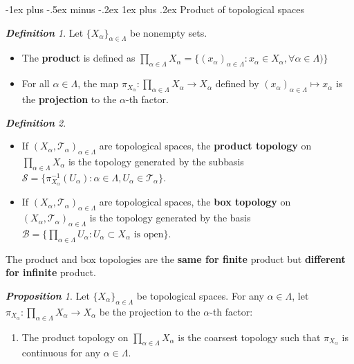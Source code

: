\documentclass[frenchspacing,9pt,landscape,a4paper]{article}
\makeatletter
\renewcommand{\subsubsection}{\@startsection{subsubsection}{3}{0mm}%
                                {-1ex plus -.5ex minus -.2ex}%
                                {1ex plus .2ex}%
                                {\normalfont\small\bfseries}}
\theoremstyle{remark}
\newtheorem*{defn}{\textbf{Definition}}
\newtheorem*{prop}{\textbf{Proposition}}
\makeatother
\begin{document}
\begin{multicols}{4}
\subsubsection{Product of topological spaces}
\begin{defn}
    Let $\{X_\alpha\}_{\alpha\in\Lambda}$ be nonempty sets.
     \begin{itemize}
         \item The \textbf{product} is defined as
             $\prod_{\alpha\in\Lambda}X_\alpha=\{(x_\alpha)_{\alpha\in\Lambda}:x_\alpha\in
             X_\alpha,\forall\alpha\in\Lambda)\}$
         \item For all $\alpha\in\Lambda$, the map  $\pi_{X_\alpha}:\prod_{\alpha\in\Lambda}X_\alpha\to
             X_\alpha$ defined by  $(x_\alpha)_{\alpha\in\Lambda}\mapsto x_\alpha$ is the
             \textbf{projection} to the  $\alpha$-th factor.
    \end{itemize}
\end{defn}
\begin{defn}
    \begin{itemize}
        \item If $(X_\alpha,\mathcal{T}_\alpha)_{\alpha\in\Lambda}$ are topological spaces, the
            \textbf{product topology} on  $\prod_{\alpha\in\Lambda}X_\alpha$ is the topology generated by
            the subbasis
            $\mathcal{S}=\{\pi_{X_\alpha}^{-1}(U_\alpha):\alpha\in\Lambda,U_\alpha\in\mathcal{T}_\alpha\}$.
        \item If  $(X_\alpha,\mathcal{T}_\alpha)_{\alpha\in\Lambda}$ are topological spaces, the
            \textbf{box topology} on  $(X_\alpha,\mathcal{T}_\alpha)_{\alpha\in\Lambda}$ is the topology
            generated by the basis  $\mathcal{B}=\{\prod_{\alpha\in\Lambda}U_\alpha:U_\alpha\subset
            X_\alpha\text{ is open}\}$.
    \end{itemize} The product and box topologies are the \textbf{same for finite} product but
    \textbf{different for infinite} product.
\end{defn}
\begin{prop}
    Let $\{X_{\alpha}\}_{\alpha\in\Lambda}$ be topological spaces. For any  $\alpha\in\Lambda$, let
    $\pi_{X_\alpha}:\prod_{\alpha\in\Lambda}X_\alpha\to X_\alpha$ be the projection to the  $\alpha$-th
    factor:
     \begin{enumerate}
         \item The product topology on $\prod_{\alpha\in\Lambda}X_\alpha$ is the coarsest topology such
             that  $\pi_{X_\alpha}$ is continuous for any  $\alpha\in\Lambda$.

\end{enumerate}
\end{prop}
\end{multicols}
\end{document}
